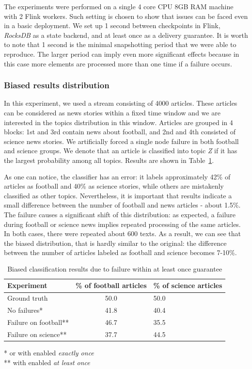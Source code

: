 The experiments were performed on a single 4 core CPU 8GB RAM machine with 2 Flink workers. Such setting is chosen to show that issues can be faced even in a basic deployment. We set up 1 second between checkpoints in Flink, {\em RocksDB} as a state backend, and at least once as a delivery guarantee. It is worth to note that 1 second is the minimal snapshotting period that we were able to reproduce. The larger period can imply even more significant effects because in this case more elements are processed more than one time if a failure occurs.

\subsubsection{Biased results distribution}

In this experiment, we used a stream consisting of 4000 articles. These articles can be considered as news stories within a fixed time window and we are interested in the topics distribution in this window. Articles are grouped in 4 blocks: 1st and 3rd contain news about football, and 2nd and 4th consisted of science news stories. We artificially forced a  single node failure in both football and science groups. We denote that an article is classified into topic {\em Z} if it has the largest probability among all topics. Results are shown in Table~\ref{biased_results}.

 As one can notice, the classifier has an error: 
it labels approximately 42\% of articles as football and 40\% as science stories, while others are mistakenly classified as other topics. Nevertheless, it is important that results indicate a small difference between the number of football and news articles - about 1.5\%. The failure causes a significant shift of this distribution: as expected, a failure during football or science news implies repeated processing of the same articles. In both cases, there were repeated about 600 texts. As a result, we can see that the biased distribution, that is hardly similar to the original: the difference between the number of articles labeled as football and science becomes 7-10\%. 

\begin{table}[htbp]
\caption{Biased classification results due to failure within at least once guarantee}
\begin{threeparttable}
\begin{tabular}{lcl}
Experiment    & \% of football articles & \% of science articles    \\
\hline
Ground truth   &   50.0    &   50.0    \\
No failures*   &   41.8    &   40.4    \\
Failure on football**   &   46.7    &   35.5    \\
Failure on science**   &   37.7    &   44.5    \\
\end{tabular}
* or with enabled {\em exactly once} \\
** with enabled {\em at least once}
\end{threeparttable}
\label{biased_results}
\end{table}


